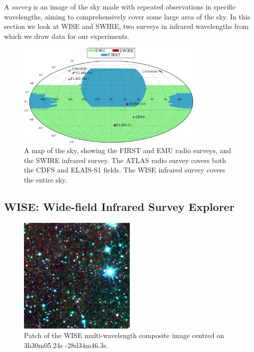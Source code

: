         A \emph{survey} is an image of the sky made with repeated observations
        in specific wavelengths, aiming to comprehensively cover some large area
        of the sky. In this section we look at WISE and SWIRE, two surveys in
        infrared wavelengths from which we draw data for our experiments.

        \begin{figure}
            \centering
            \includegraphics[width=0.8\textwidth]{images/skymap2.pdf}
            \caption{A map of the sky, showing the FIRST and EMU radio surveys,
                and the SWIRE infrared survey. The ATLAS radio survey
                covers both the CDFS and ELAIS-S1 fields. The WISE infrared
                survey covers the entire sky.}
        \end{figure}

        \subsection{WISE: Wide-field Infrared Survey Explorer}
        \label{sec:wise}

            \begin{figure}
                \centering
                \includegraphics[width=0.5\textwidth]
                    {images/WISE_3h30m05.24s-28d34m46.3s.png}
                \caption{Patch of the WISE multi-wavelength composite image
                    centred on 3h30m05.24s -28d34m46.3s.}
                \label{fig:wise}
            \end{figure}

